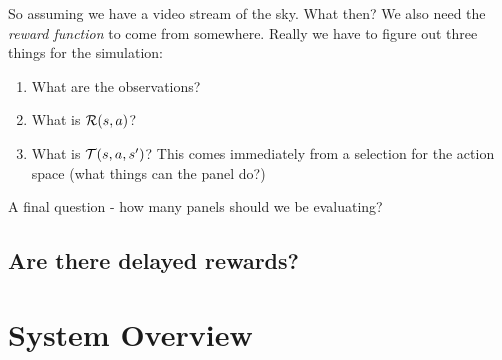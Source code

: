 \documentclass[11pt]{article}
\begin{document}
So assuming we have a video stream of the sky. What then? We also need the {\it reward function} to come from somewhere. Really we have to figure out three things for the simulation:
\begin{enumerate}
\item What are the observations?
\item What is $\mathcal{R}(s,a)$?
\item What is $\mathcal{T}(s,a,s')$? This comes immediately from a selection for the action space (what things can the panel do?)
\end{enumerate}

A final question - how many panels should we be evaluating?

\subsection{Are there delayed rewards?}






\section{System Overview}















\end{document}
